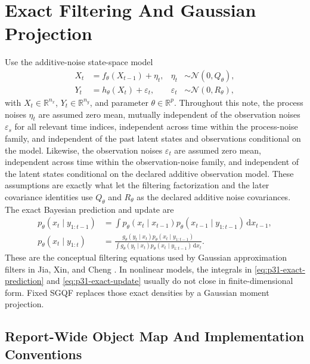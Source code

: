 \documentclass[11pt]{article}
\numberwithin{equation}{section}
\newcommand{\R}{\mathbb R}
\newcommand{\N}{\mathcal N}
\newcommand{\dd}{\,\mathrm d}
\begin{document}
\section{Exact Filtering And Gaussian Projection}
\label{sec:p31-ssm}

Use the additive-noise state-space model
\begin{align}
  X_t &= f_\theta(X_{t-1})+\eta_t,
  &
  \eta_t&\sim\N(0,Q_\theta),
  \label{eq:p31-state-model}\\
  Y_t &= h_\theta(X_t)+\varepsilon_t,
  &
  \varepsilon_t&\sim\N(0,R_\theta),
  \label{eq:p31-observation-model}
\end{align}
with \(X_t\in\R^{n_x}\), \(Y_t\in\R^{n_y}\), and parameter \(\theta\in\R^p\).
Throughout this note, the process noises \(\eta_t\) are assumed zero mean,
mutually independent of the observation noises \(\varepsilon_s\) for all relevant
time indices, independent across time within the process-noise family, and
independent of the past latent states and observations conditional on the model.
Likewise, the observation noises \(\varepsilon_t\) are assumed zero mean,
independent across time within the observation-noise family, and independent of
the latent states conditional on the declared additive observation model.  These
assumptions are exactly what let the filtering factorization and the later
covariance identities use \(Q_\theta\) and \(R_\theta\) as the declared additive
noise covariances.
The exact Bayesian prediction and update are
\begin{align}
  p_\theta(x_t\mid y_{1:t-1})
  &=
  \int p_\theta(x_t\mid x_{t-1})
       p_\theta(x_{t-1}\mid y_{1:t-1})\dd x_{t-1},
  \label{eq:p31-exact-prediction}\\
  p_\theta(x_t\mid y_{1:t})
  &=
  \frac{
  g_\theta(y_t\mid x_t)
  p_\theta(x_t\mid y_{1:t-1})}
  {\int g_\theta(y_t\mid x_t)
  p_\theta(x_t\mid y_{1:t-1})\dd x_t}.
  \label{eq:p31-exact-update}
\end{align}
These are the conceptual filtering equations used by Gaussian approximation
filters in Jia, Xin, and Cheng \cite[Section 2]{jia2012sparsegrid}.  In
nonlinear models, the integrals in \eqref{eq:p31-exact-prediction} and
\eqref{eq:p31-exact-update} usually do not close in finite-dimensional form.
Fixed SGQF replaces those exact densities by a Gaussian moment projection.

\subsection{Report-Wide Object Map And Implementation Conventions}
\label{subsec:p32-object-map}
\end{document}
